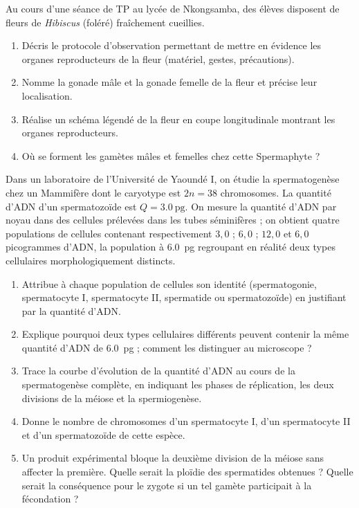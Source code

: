 \documentclass[11pt]{article}
\newcounter{popsec}
\newcounter{popsub}
\newcommand{\courssub}[1]{%
  \stepcounter{popsub}%
  \par\vspace{9pt}\noindent{\popxbold\fontsize{11.5}{13}\selectfont\color{popink}{\color{poporange}\thepopsec.\thepopsub}\hspace{6pt}#1}\par\nopagebreak\vspace{4pt}
}
\begin{document}
\begin{exercice}
Au cours d'une séance de TP au lycée de Nkongsamba, des élèves disposent de fleurs de \emph{Hibiscus} (foléré) fraîchement cueillies.
\begin{enumerate}
\item Décris le protocole d'observation permettant de mettre en évidence les organes reproducteurs de la fleur (matériel, gestes, précautions).
\item Nomme la gonade mâle et la gonade femelle de la fleur et précise leur localisation.
\item Réalise un schéma légendé de la fleur en coupe longitudinale montrant les organes reproducteurs.
\item Où se forment les gamètes mâles et femelles chez cette Spermaphyte ?
\end{enumerate}
\end{exercice}

\courssub{Je me prépare au Bac}

\begin{exercice}
Dans un laboratoire de l'Université de Yaoundé I, on étudie la spermatogenèse chez un Mammifère dont le caryotype est $2n = 38$ chromosomes. La quantité d'ADN d'un spermatozoïde est $Q = \SI{3,0}{\pico\gram}$. On mesure la quantité d'ADN par noyau dans des cellules prélevées dans les tubes séminifères ; on obtient quatre populations de cellules contenant respectivement $3,0$ ; $6,0$ ; $12,0$ et $6,0$ picogrammes d'ADN, la population à \SI{6,0}{\pico\gram} regroupant en réalité deux types cellulaires morphologiquement distincts.
\begin{enumerate}
\item Attribue à chaque population de cellules son identité (spermatogonie, spermatocyte I, spermatocyte II, spermatide ou spermatozoïde) en justifiant par la quantité d'ADN.
\item Explique pourquoi deux types cellulaires différents peuvent contenir la même quantité d'ADN de \SI{6,0}{\pico\gram} ; comment les distinguer au microscope ?
\item Trace la courbe d'évolution de la quantité d'ADN au cours de la spermatogenèse complète, en indiquant les phases de réplication, les deux divisions de la méiose et la spermiogenèse.
\item Donne le nombre de chromosomes d'un spermatocyte I, d'un spermatocyte II et d'un spermatozoïde de cette espèce.
\item Un produit expérimental bloque la deuxième division de la méiose sans affecter la première. Quelle serait la ploïdie des spermatides obtenues ? Quelle serait la conséquence pour le zygote si un tel gamète participait à la fécondation ?
\end{enumerate}
\end{exercice}
\end{document}
